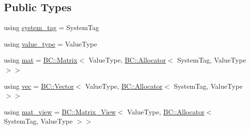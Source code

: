 \subsection*{Public Types}
\begin{DoxyCompactItemize}
\item 
using \hyperlink{structBC_1_1nn_1_1OutputLayer_a1b77b5de073e3b5d31971c330f2bfff0}{system\+\_\+tag} = System\+Tag
\item 
using \hyperlink{structBC_1_1nn_1_1OutputLayer_ada8d5620e6240f6faa1e6d30d5ac13ff}{value\+\_\+type} = Value\+Type
\item 
using \hyperlink{structBC_1_1nn_1_1OutputLayer_a0b0f4e2b2c45882e60ee3cc95a817b59}{mat} = \hyperlink{namespaceBC_1_1tensors_1_1common__using_a6fc3153d379a42b1a97df46ed5b71a29}{B\+C\+::\+Matrix}$<$ Value\+Type, \hyperlink{namespaceBC_a934f94b17b06290e6b241e5f59930c5f}{B\+C\+::\+Allocator}$<$ System\+Tag, Value\+Type $>$$>$
\item 
using \hyperlink{structBC_1_1nn_1_1OutputLayer_a9e86692847201a95c411cab1ba1129fb}{vec} = \hyperlink{namespaceBC_1_1tensors_1_1common__using_ab2d6784064c0dda8aef3c2a9177ffa77}{B\+C\+::\+Vector}$<$ Value\+Type, \hyperlink{namespaceBC_a934f94b17b06290e6b241e5f59930c5f}{B\+C\+::\+Allocator}$<$ System\+Tag, Value\+Type $>$$>$
\item 
using \hyperlink{structBC_1_1nn_1_1OutputLayer_aeb45a3c352a438cfb69bb17b40a14bf2}{mat\+\_\+view} = \hyperlink{namespaceBC_1_1tensors_1_1common__using_a2ef3cf5721d0ae966c30051cbe6f24b6}{B\+C\+::\+Matrix\+\_\+\+View}$<$ Value\+Type, \hyperlink{namespaceBC_a934f94b17b06290e6b241e5f59930c5f}{B\+C\+::\+Allocator}$<$ System\+Tag, Value\+Type $>$$>$
\end{DoxyCompactItemize}

